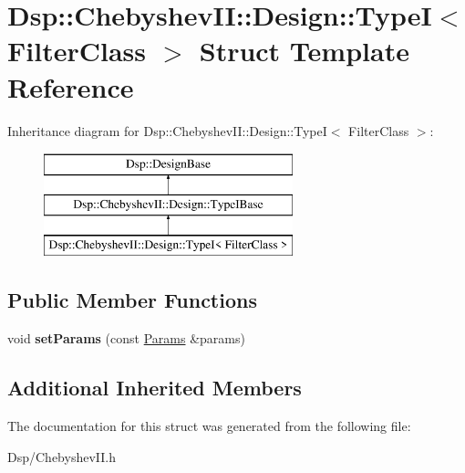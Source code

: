 \hypertarget{structDsp_1_1ChebyshevII_1_1Design_1_1TypeI}{\section{Dsp\-:\-:Chebyshev\-I\-I\-:\-:Design\-:\-:Type\-I$<$ Filter\-Class $>$ Struct Template Reference}
\label{structDsp_1_1ChebyshevII_1_1Design_1_1TypeI}
}
Inheritance diagram for Dsp\-:\-:Chebyshev\-I\-I\-:\-:Design\-:\-:Type\-I$<$ Filter\-Class $>$\-:\begin{figure}[H]
\begin{center}
\leavevmode
\includegraphics[height=3.000000cm]{structDsp_1_1ChebyshevII_1_1Design_1_1TypeI}
\end{center}
\end{figure}
\subsection*{Public Member Functions}
\begin{DoxyCompactItemize}
\item 
\hypertarget{structDsp_1_1ChebyshevII_1_1Design_1_1TypeI_a28969521484f262524fe4f1aafcfe90d}{void {\bfseries set\-Params} (const \hyperlink{structDsp_1_1Params}{Params} \&params)}\label{structDsp_1_1ChebyshevII_1_1Design_1_1TypeI_a28969521484f262524fe4f1aafcfe90d}

\end{DoxyCompactItemize}
\subsection*{Additional Inherited Members}


The documentation for this struct was generated from the following file\-:\begin{DoxyCompactItemize}
\item 
Dsp/Chebyshev\-I\-I.\-h\end{DoxyCompactItemize}
